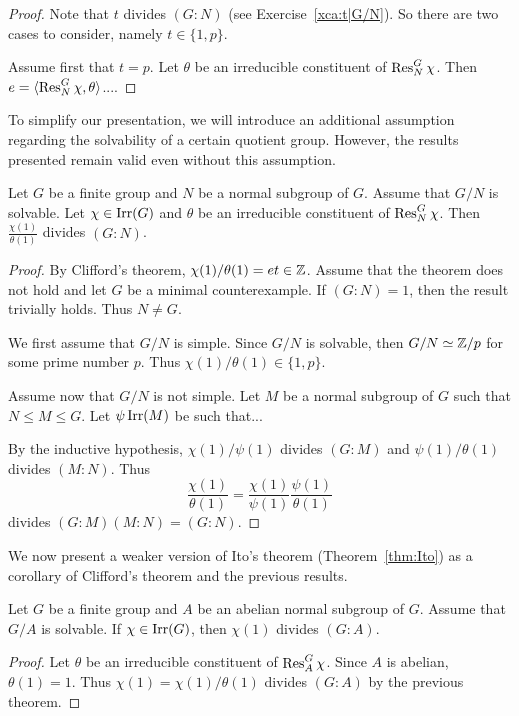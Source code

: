 \begin{proof}
    Note that $t$ divides $(G:N)$ (see Exercise~\ref{xca:t|G/N}). 
    So there are two cases
    to consider, namely $t\in\{1,p\}$. 

    Assume first that $t=p$. Let $\theta$ be an irreducible constituent of $\operatorname{Res}_N^G\chi$. Then $e=\langle\operatorname{Res}_N^G\chi,\theta\rangle$.... 
\end{proof}

To simplify our presentation, we will introduce an additional assumption regarding the solvability of a certain quotient group. However, the results presented remain valid even without this assumption.

\begin{theorem}
    Let $G$ be a finite group and $N$ be a normal subgroup of $G$. Assume that $G/N$ is solvable. Let $\chi\in\operatorname{Irr}(G)$ 
    and $\theta$ be an irreducible constituent of $\operatorname{Res}_N^G\chi$. Then 
    $\frac{\chi(1)}{\theta(1)}$ divides $(G:N)$. 
\end{theorem}

\begin{proof}
    By Clifford's theorem, $\chi(1)/\theta(1)=et\in\mathbb{Z}$. Assume 
    that the theorem does not hold and let $G$ 
    be a minimal counterexample. 
    If $(G:N)=1$, then the result trivially holds. Thus $N\ne G$. 

    We first assume that $G/N$ is simple. Since $G/N$ is solvable, 
    then $G/N\simeq\mathbb{Z}/p$ for some prime number $p$. Thus 
    $\chi(1)/\theta(1)\in\{1,p\}$. 

    Assume now that $G/N$ is not simple. Let $M$ be a normal
    subgroup of $G$ such that $N\leq M\leq G$. Let 
    $\psi\operatorname{Irr}(M)$ be such that...

    By the inductive hypothesis, 
    $\chi(1)/\psi(1)$ divides $(G:M)$ and 
    $\psi(1)/\theta(1)$ divides $(M:N)$. Thus 
    \[
    \frac{\chi(1)}{\theta(1)}=\frac{\chi(1)}{\psi(1)}\frac{\psi(1)}{\theta(1)}
    \]
    divides $(G:M)(M:N)=(G:N)$. 
\end{proof}

We now present a weaker version of Ito’s theorem (Theorem~\ref{thm:Ito}) as a corollary of Clifford’s theorem and
the previous results. 

\begin{theorem}[Ito]
    Let $G$ be a finite group and $A$ be an abelian normal 
    subgroup of $G$. Assume that $G/A$ is solvable. 
    If $\chi\in\operatorname{Irr}(G)$, then $\chi(1)$ divides $(G:A)$. 
\end{theorem}

\begin{proof}
    Let $\theta$ be an irreducible constituent of $\operatorname{Res}_A^G\chi$. 
    Since $A$ is abelian, $\theta(1)=1$. Thus 
    $\chi(1)=\chi(1)/\theta(1)$ divides $(G:A)$ by 
    the previous theorem. 
\end{proof}